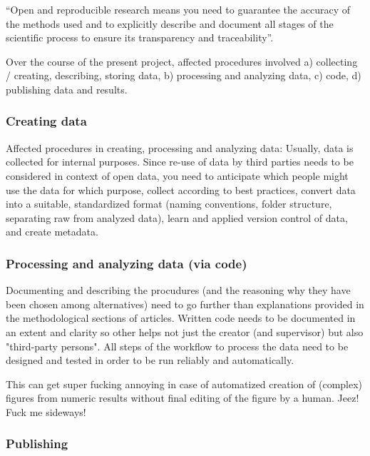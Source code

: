 %
``Open and reproducible research means you need to guarantee the accuracy of the
methods used and to explicitly describe and document all stages of the
scientific process to ensure its transparency and traceability''.

%
Over the course of the present project, affected procedures involved
a) collecting / creating, describing, storing data,
b) processing and analyzing data,
c) code,
d) publishing data and results.


\subsubsection{Creating data}

Affected procedures in creating, processing and analyzing data:
%
Usually, data is collected for internal purposes.
%
Since re-use of data by third parties needs to be considered in context of open
data, you need to
%
anticipate which people might use the data for which purpose,
%
collect according to best practices,
%
convert data into a suitable, standardized format (naming conventions, folder
structure, separating raw from analyzed data),
%
learn and applied version control of data, and
%
create metadata.


\subsubsection{Processing and analyzing data (via code)}
%
Documenting and describing the procudures (and the reasoning why they have been
chosen among alternatives) need to go further than explanations provided in the
methodological sections of articles.
%
Written code needs to be documented in an extent and clarity so other helps
not just the creator (and supervisor) but also "third-party persons".
%
All steps of the workflow to process the data need to be designed and tested in
order to be run reliably and automatically.


%
This can get super fucking annoying in case of automatized creation of (complex)
figures from numeric results without final editing of the figure by a human.
Jeez! Fuck me sideways!


\subsubsection{Publishing}

